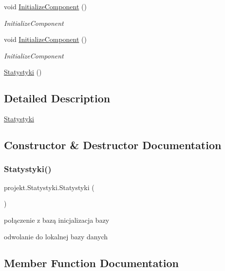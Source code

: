 \begin{DoxyCompactItemize}
void \mbox{\hyperlink{classprojekt_1_1_statystyki_a6f4801d8176e1c715f5260bf055b0915}{Initialize\+Component}} ()
\begin{DoxyCompactList}\small\item\em Initialize\+Component \end{DoxyCompactList}\item 
void \mbox{\hyperlink{classprojekt_1_1_statystyki_a6f4801d8176e1c715f5260bf055b0915}{Initialize\+Component}} ()
\begin{DoxyCompactList}\small\item\em Initialize\+Component \end{DoxyCompactList}\item 
\mbox{\hyperlink{classprojekt_1_1_statystyki_ae90a003d3720200a8ef9b33e6f9f0225}{Statystyki}} ()
\end{DoxyCompactItemize}


\subsection{Detailed Description}
\mbox{\hyperlink{classprojekt_1_1_statystyki}{Statystyki}} 



\subsection{Constructor \& Destructor Documentation}
\mbox{\label{classprojekt_1_1_statystyki_ae90a003d3720200a8ef9b33e6f9f0225}} 
\subsubsection{\texorpdfstring{Statystyki()}{Statystyki()}}
{\footnotesize\ttfamily projekt.\+Statystyki.\+Statystyki (\begin{DoxyParamCaption}{ }\end{DoxyParamCaption})\hspace{0.3cm}{\ttfamily [inline]}}





połączenie z bazą inicjalizacja bazy

odwolanie do lokalnej bazy danych 

\subsection{Member Function Documentation}
\mbox{\label{classprojekt_1_1_statystyki_a6f4801d8176e1c715f5260bf055b0915}} 
